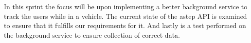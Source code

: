 In this sprint the focus will be upon implementing a better background service to track the users while in a vehicle.
The current state of the \gls{astep} API is examined to ensure that it fulfills our requirements for it.
And lastly is a test performed on the background service to ensure collection of correct data.